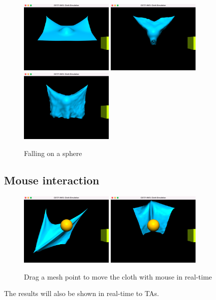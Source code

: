 \documentclass[acmtog]{acmart}
\begin{document}
\begin{figure}[H]
	\centering
	\includegraphics[width=0.4\textwidth]{results/2-falling-on-sphere.jpg}
	\includegraphics[width=0.4\textwidth]{results/3-falling-on-sphere-2.jpg}
	\includegraphics[width=0.4\textwidth]{results/4-falling-on-sphere3.jpg}
	\caption{Falling on a sphere}
\end{figure}

\subsection{Mouse interaction}

\begin{figure}[H]
	\centering
	\includegraphics[width=0.4\textwidth]{results/5-mouse-drag.jpg}
	\includegraphics[width=0.4\textwidth]{results/6-mouse-drag-2.jpg}
	\caption{Drag a mesh point to move the cloth with mouse in real-time}
\end{figure}

The results will also be shown in real-time to TAs.
\end{document}
